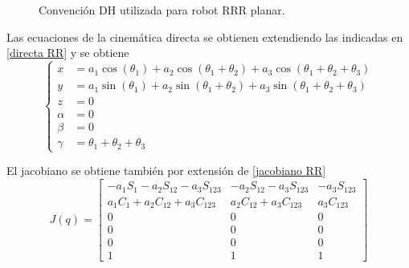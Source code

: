 \documentclass[a4paper,12pt]{article}
\begin{document}
\begin{figure}[H]
    \centering
    \begin{adjustbox}{scale = 0.55, max width=\columnwidth}
    \end{adjustbox}
    \caption{Convención DH utilizada para robot RRR planar.}
\end{figure}

Las ecuaciones de la cinemática directa se obtienen extendiendo las indicadas en \cref{directa RR} y se obtiene
\begin{equation}
    \left\{
    \begin{aligned}
    x &= a_1 \cos(\theta_1) + a_2 \cos(\theta_1 + \theta_2) + a_3 \cos(\theta_1 + \theta_2 + \theta_3)\\
    y &= a_1 \sin(\theta_1) + a_2 \sin(\theta_1 + \theta_2) + a_3 \sin(\theta_1 + \theta_2 + \theta_3)\\
    z &= 0 \\
    \alpha &= 0 \\
    \beta &= 0 \\
    \gamma &= \theta_1 + \theta_2 + \theta_3
    \end{aligned}
    \right.
    \label{directa RRR}
\end{equation}

El jacobiano se obtiene también por extensión de \cref{jacobiano RR}
\begin{equation}
    J(q) = 
    \begin{bmatrix}
        -a_1S_1 - a_2S_{12} - a_3S_{123}& -a_2S_{12} - a_3S_{123} & - a_3S_{123}\\
        a_1C_1 + a_2C_{12} + a_3C_{123}& a_2C_{12} + a_3C_{123}  &  a_3C_{123}\\
        0                               & 0                       & 0\\
        0                               & 0                       & 0\\
        0                               & 0                       & 0\\
        1                               & 1                       & 1
    \end{bmatrix}
    \label{jacobiano RRR}
\end{equation}
\end{document}
